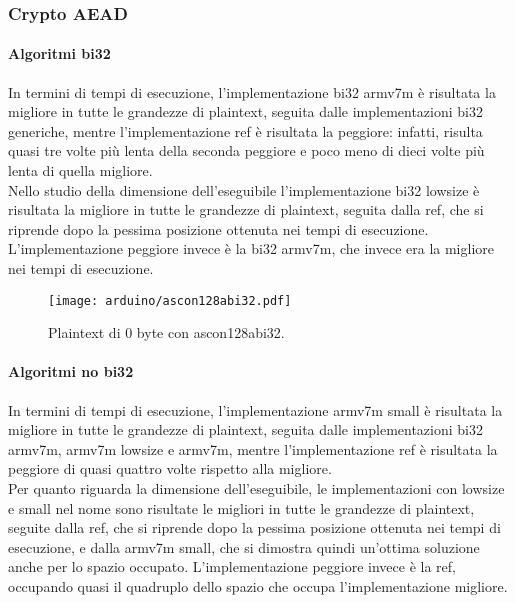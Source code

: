 \subsubsection{Crypto AEAD}

\paragraph{Algoritmi bi32}

In termini di tempi di esecuzione, l'implementazione bi32 armv7m è risultata la migliore in tutte le grandezze di plaintext, seguita dalle implementazioni bi32 generiche, mentre l'implementazione ref è risultata la peggiore: infatti, risulta quasi tre volte più lenta della seconda peggiore e poco meno di dieci volte più lenta di quella migliore. \\

\noindent Nello studio della dimensione dell'eseguibile l'implementazione bi32 lowsize è risultata la migliore in tutte le grandezze di plaintext, seguita dalla ref, che si riprende dopo la pessima posizione ottenuta nei tempi di esecuzione. L'implementazione peggiore invece è la bi32 armv7m, che invece era la migliore nei tempi di esecuzione.

\begin{figure}[H]
    \centering
    \texttt{[image: arduino/ascon128abi32.pdf]}
    \caption{Plaintext di 0 byte con ascon128abi32.}
\end{figure}

\paragraph{Algoritmi no bi32}

In termini di tempi di esecuzione, l'implementazione armv7m small è risultata la migliore in tutte le grandezze di plaintext, seguita dalle implementazioni bi32 armv7m, armv7m lowsize e armv7m, mentre l'implementazione ref è risultata la peggiore di quasi quattro volte rispetto alla migliore. \\

\noindent Per quanto riguarda la dimensione dell'eseguibile, le implementazioni con lowsize e small nel nome sono risultate le migliori in tutte le grandezze di plaintext, seguite dalla ref, che si riprende dopo la pessima posizione ottenuta nei tempi di esecuzione, e dalla armv7m small, che si dimostra quindi un'ottima soluzione anche per lo spazio occupato. L'implementazione peggiore invece è la ref, occupando quasi il quadruplo dello spazio che occupa l'implementazione migliore.

